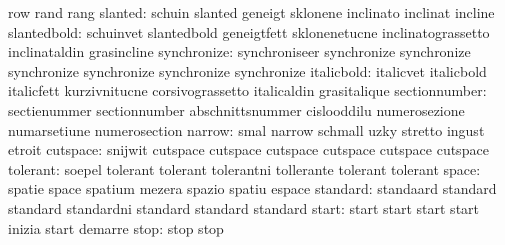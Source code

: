                            row                       rand
                           rang
                  slanted: schuin                    slanted
                           geneigt                   sklonene
                           inclinato                 inclinat
                           incline
              slantedbold: schuinvet                 slantedbold
                           geneigtfett               sklonenetucne
                           inclinatograssetto        inclinataldin
                           grasincline
              synchronize: synchroniseer             synchronize
                           synchronize               synchronize
                           synchronize               synchronize
                           synchronize
               italicbold: italicvet                 italicbold
                           italicfett                kurzivnitucne
                           corsivograssetto          italicaldin
                           grasitalique
            sectionnumber: sectienummer              sectionnumber
                           abschnittsnummer          cislooddilu
                           numerosezione             numarsetiune
                           numerosection
                   narrow: smal                      narrow
                           schmall                   uzky
                           stretto                   ingust
                           etroit
                 cutspace: snijwit                   cutspace
                           cutspace                  cutspace
                           cutspace                  cutspace
                           cutspace
                 tolerant: soepel                    tolerant
                           tolerant                  tolerantni
                           tollerante                tolerant
                           tolerant
                    space: spatie                    space
                           spatium                   mezera
                           spazio                    spatiu
                           espace
                 standard: standaard                 standard
                           standard                  standardni
                           standard                  standard
                           standard
                    start: start                     start
                           start                     start
                           inizia                    start
                           demarre
                     stop: stop                      stop
